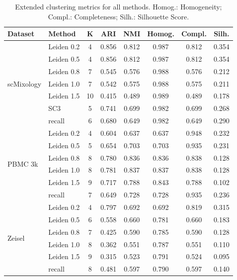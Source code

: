 \begin{table}[htbp]
\centering
\caption{Extended clustering metrics for all methods. Homog.: Homogeneity; Compl.: Completeness; Silh.: Silhouette Score.}
\label{tab:extended_metrics}
\small
\begin{tabular}{@{}llcccccc@{}}
\toprule
\textbf{Dataset} & \textbf{Method} & \textbf{K} & \textbf{ARI} & \textbf{NMI} & \textbf{Homog.} & \textbf{Compl.} & \textbf{Silh.} \\
\midrule
\multirow{7}{*}{scMixology}
    & Leiden 0.2 & 4 & 0.856 & 0.812 & 0.987 & 0.812 & 0.354 \\
    & Leiden 0.5 & 4 & 0.856 & 0.812 & 0.987 & 0.812 & 0.354 \\
    & Leiden 0.8 & 7 & 0.545 & 0.576 & 0.988 & 0.576 & 0.212 \\
    & Leiden 1.0 & 7 & 0.542 & 0.575 & 0.988 & 0.575 & 0.211 \\
    & Leiden 1.5 & 10 & 0.415 & 0.489 & 0.989 & 0.489 & 0.178 \\
    & SC3 & 5 & 0.741 & 0.699 & 0.982 & 0.699 & 0.268 \\
    & recall & 6 & 0.680 & 0.649 & 0.982 & 0.649 & 0.290 \\
\midrule
\multirow{6}{*}{PBMC 3k}
    & Leiden 0.2 & 4 & 0.604 & 0.637 & 0.637 & 0.948 & 0.232 \\
    & Leiden 0.5 & 5 & 0.654 & 0.703 & 0.703 & 0.935 & 0.231 \\
    & Leiden 0.8 & 8 & 0.780 & 0.836 & 0.836 & 0.838 & 0.128 \\
    & Leiden 1.0 & 8 & 0.781 & 0.837 & 0.837 & 0.838 & 0.128 \\
    & Leiden 1.5 & 9 & 0.717 & 0.788 & 0.843 & 0.788 & 0.102 \\
    & recall & 7 & 0.649 & 0.728 & 0.728 & 0.935 & 0.236 \\
\midrule
\multirow{6}{*}{Zeisel}
    & Leiden 0.2 & 4 & 0.797 & 0.692 & 0.692 & 0.819 & 0.315 \\
    & Leiden 0.5 & 6 & 0.558 & 0.660 & 0.781 & 0.660 & 0.183 \\
    & Leiden 0.8 & 7 & 0.425 & 0.590 & 0.785 & 0.590 & 0.128 \\
    & Leiden 1.0 & 8 & 0.362 & 0.551 & 0.787 & 0.551 & 0.110 \\
    & Leiden 1.5 & 9 & 0.315 & 0.523 & 0.791 & 0.524 & 0.095 \\
    & recall & 8 & 0.481 & 0.597 & 0.790 & 0.597 & 0.140 \\
\bottomrule
\end{tabular}
\end{table}

